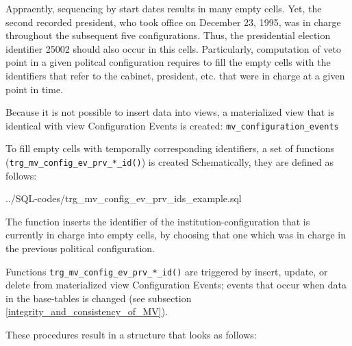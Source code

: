 Appraently, sequencing by start dates results in many empty cells. 
Yet, the second recorded president, who took office on December 23, 1995, was in charge throughout the subsequent five configurations. Thus, the presidential election identifier 25002 should also occur in this cells.
Particularly, computation of veto point in a given politcal configuration requires to fill the empty cells with the identifiers that refer to the cabinet, president, etc. that were in charge at a given point in time.

Because it is not possible to insert data into views, a materialized view that is identical with view Configuration Events is created: \texttt{\footnotesize mv\_configuration\_events}

To fill empty cells with temporally corresponding identifiers, a set of functions (\texttt{\footnotesize trg\_mv\_config\_ev\_prv\_*\_id()}) is created
Schematically, they are defined as follows:

%
{../SQL-codes/trg_mv_config_ev_prv_ids_example.sql}

The function inserts the identifier of the institution-configuration that is currently in charge into empty cells, by choosing that one which was in charge in the previous political configuration.

Functions \texttt{\footnotesize trg\_mv\_config\_ev\_prv\_*\_id()} are triggered by insert, update, or delete from materialized view Configuration Events; events that occur when data in the base-tables is changed (see subsection \ref{integrity_and_consistency_of_MV}).


These procedures result in a structure that looks as follows:

